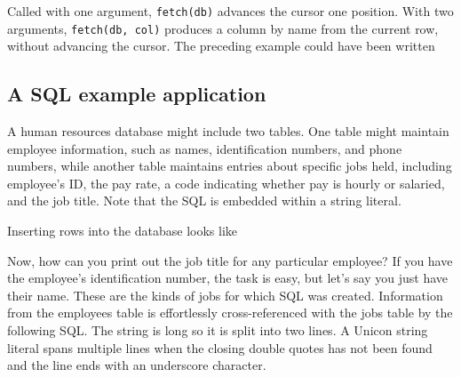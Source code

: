 
\noindent
Called with one argument, \texttt{fetch(db)} advances the cursor
one position. With two arguments, \texttt{fetch(db, col)} produces a
column by name from the current row, without advancing the cursor.
The preceding example could have been written


\subsection*{A SQL example application}

A human resources database might include two tables. One
table might maintain employee information, such as names,
identification numbers, and phone numbers, while another table
maintains entries about specific jobs held, including
employee's ID, the pay rate, a code indicating whether
pay is hourly or salaried, and the job title. Note that the SQL is
embedded within a string literal.


\noindent
Inserting rows into the database looks like


Now, how can you print out the job title for any particular employee? If
you have the employee's identification number, the
task is easy, but let's say you just have their name.
These are the kinds of jobs for which SQL was created. Information from
the employees table is effortlessly cross-referenced with the jobs
table by the following SQL. The string is long so it is split into
two lines. A Unicon string literal spans multiple lines when the
closing double quotes has not been found and the line ends with an
underscore character.


